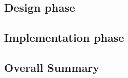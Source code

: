     \subsection{Design phase}
    \label{evaluation:design}
        
        
    \subsection{Implementation phase}
    \label{evaluation:implementation}
        
        
    \subsection{Overall Summary}    
    \label{evaluation:summary}
        




